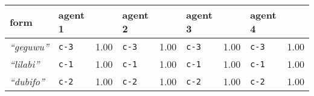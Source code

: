 
{\renewcommand{\arraystretch}{1.5}
\begin{tabular}{@{}p{1.2cm}|p{1.6cm}@{}p{0.8cm}@{}|p{1.6cm}@{}p{0.8cm}@{}|p{1.6cm}@{}p{0.8cm}@{}|p{1.6cm}@{}p{0.8cm}@{}}
form & agent 1 &  & agent 2 &  & agent 3 &  & agent 4 & \\
\hline
\textit{``geguwu''}&\texttt{c-3}
&1.00&\texttt{c-3}
&1.00&\texttt{c-3}
&1.00&\texttt{c-3}
&1.00\\
\hline
\textit{``lilabi''}&\texttt{c-1}
&1.00&\texttt{c-1}
&1.00&\texttt{c-1}
&1.00&\texttt{c-1}
&1.00\\
\hline
\textit{``dubifo''}&\texttt{c-2}
&1.00&\texttt{c-2}
&1.00&\texttt{c-2}
&1.00&\texttt{c-2}
&1.00\\
\end{tabular}}

